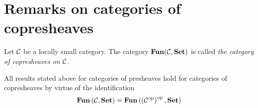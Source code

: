 \section{Remarks on categories of copresheaves}

\begin{definition}
Let ${\mathcal C}$ be a locally small category. The category $\mathbf{Fun}({\mathcal C},\mathbf{Set})$ is called \textit{the category of copresheaves on ${\mathcal C}$}.
\end{definition}
\noindent
All results stated above for categories of presheaves hold for categories of copresheaves by virtue of the identification 
$$\mathbf{Fun}\left({\mathcal C},\mathbf{Set}\right) = \mathbf{Fun}\left(\left({\mathcal C}^{\mathrm{op}}\right)^{\mathrm{op}},\mathbf{Set}\right)$$


\small




